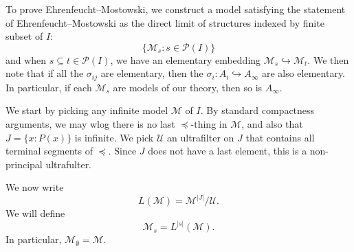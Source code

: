 \documentclass[a4paper]{article}
\begin{document}
To prove Ehrenfeucht--Mostowski, we construct a model satisfying the statement of Ehrenfeucht--Mostowski as the direct limit of structures indexed by finite subset of $I$:
\[
  \{\mathcal{M}_s: s \in \mathcal{P}(I)\}
\]
and when $s \subseteq t \in \mathcal{P}(I)$, we have an elementary embedding $\mathcal{M}_s \hookrightarrow \mathcal{M}_t$. We then note that if all the $\sigma_{ij}$ are elementary, then the $\sigma_i: A_i \hookrightarrow A_\infty$ are also elementary. In particular, if each $\mathcal{M}_s$ are models of our theory, then so is $A_\infty$.

We start by picking any infinite model $\mathcal{M}$ of $I$. By standard compactness arguments, we may wlog there is no last $\preccurlyeq$-thing in $\mathcal{M}$, and also that $J = \{x: P(x)\}$ is infinite. We pick $\mathcal{U}$ an ultrafilter on $J$ that contains all terminal segments of $\preccurlyeq$. Since $J$ does not have a last element, this is a non-principal ultrafulter.

We now write
\[
  L(\mathcal{M}) = \mathcal{M}^{|J|}/\mathcal{U}.
\]
We will define
\[
  \mathcal{M}_s = L^{|s|}(\mathcal{M}).
\]
In particular, $\mathcal{M}_{\emptyset} = \mathcal{M}$.
\end{document}
